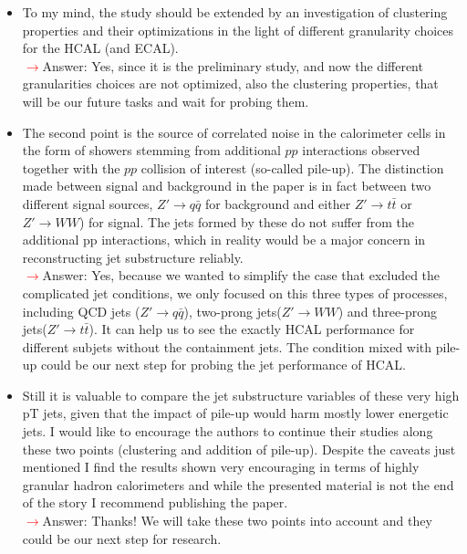 \documentclass[final,1p,11pt]{elsarticle}
\begin{document}
\begin{itemize}
\item To my mind, the study should be extended by an investigation of clustering properties and their optimizations in the light of different granularity choices for the HCAL (and ECAL).\\
 \textcolor{red}{$\rightarrow$}Answer: Yes, since it is the preliminary study, and now the different granularities choices are not optimized, also the clustering properties, that will be our future tasks and wait for probing them.\\
\item The second point is the source of correlated noise in the calorimeter cells in the form of showers stemming from additional $pp$ interactions observed together with the $pp$ collision of interest (so-called pile-up). The distinction made between signal and background in the paper is in fact between two different signal sources, $Z'\rightarrow q\bar{q}$ for background and either $Z' \rightarrow t\bar{t}$ or $Z' \rightarrow WW$) for signal. The jets formed by these do not suffer from the additional pp interactions, which in reality would be a major concern in reconstructing jet substructure reliably.\\
 \textcolor{red}{$\rightarrow$}Answer: Yes, because we wanted to simplify the case that excluded the complicated jet conditions, we only focused on this three types of processes, including QCD jets ($Z'\rightarrow q\bar{q}$), two-prong jets($Z' \rightarrow WW$) and three-prong jets($Z' \rightarrow t\bar{t}$). It can help us to see the exactly HCAL performance for different subjets without the containment jets. The condition mixed with pile-up could be our next step for probing the jet performance of HCAL.
\item Still it is valuable to compare the jet substructure variables of these very high pT jets, given that the impact of pile-up would harm mostly lower energetic jets. I would like to encourage the authors to continue their studies along these two points (clustering and addition of pile-up). Despite the caveats just mentioned I find the results shown very encouraging in terms of highly granular hadron calorimeters and while the presented material is not the end of the story I recommend publishing the paper.\\
 \textcolor{red}{$\rightarrow$}Answer: Thanks! We will take these two points into account and they could be our next step for research. 
\end{itemize}
\end{document}
